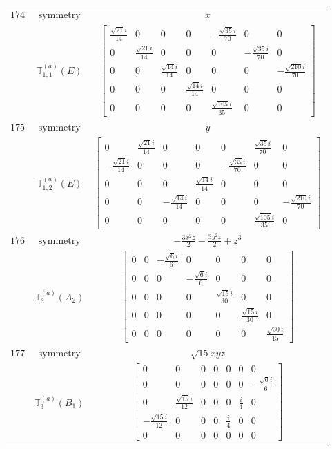 \documentclass[fleqn,8pt,landscape]{jsarticle}
\begin{document}
\begin{longtable}{ccc}
$ 174 $ & $ \text{symmetry} $ & $ x $ \\
$  $ & $ \mathbb{T}_{1,1}^{(a)}(E) $ & $ \begin{bmatrix} \frac{\sqrt{21} i}{14} & 0 & 0 & 0 & - \frac{\sqrt{35} i}{70} & 0 & 0 \\ 0 & \frac{\sqrt{21} i}{14} & 0 & 0 & 0 & - \frac{\sqrt{35} i}{70} & 0 \\ 0 & 0 & \frac{\sqrt{14} i}{14} & 0 & 0 & 0 & - \frac{\sqrt{210} i}{70} \\ 0 & 0 & 0 & \frac{\sqrt{14} i}{14} & 0 & 0 & 0 \\ 0 & 0 & 0 & 0 & \frac{\sqrt{105} i}{35} & 0 & 0 \end{bmatrix} $ \\ \hline
$ 175 $ & $ \text{symmetry} $ & $ y $ \\
$  $ & $ \mathbb{T}_{1,2}^{(a)}(E) $ & $ \begin{bmatrix} 0 & \frac{\sqrt{21} i}{14} & 0 & 0 & 0 & \frac{\sqrt{35} i}{70} & 0 \\ - \frac{\sqrt{21} i}{14} & 0 & 0 & 0 & - \frac{\sqrt{35} i}{70} & 0 & 0 \\ 0 & 0 & 0 & \frac{\sqrt{14} i}{14} & 0 & 0 & 0 \\ 0 & 0 & - \frac{\sqrt{14} i}{14} & 0 & 0 & 0 & - \frac{\sqrt{210} i}{70} \\ 0 & 0 & 0 & 0 & 0 & \frac{\sqrt{105} i}{35} & 0 \end{bmatrix} $ \\ \hline
$ 176 $ & $ \text{symmetry} $ & $ - \frac{3 x^{2} z}{2} - \frac{3 y^{2} z}{2} + z^{3} $ \\
$  $ & $ \mathbb{T}_{3}^{(a)}(A_{2}) $ & $ \begin{bmatrix} 0 & 0 & - \frac{\sqrt{6} i}{6} & 0 & 0 & 0 & 0 \\ 0 & 0 & 0 & - \frac{\sqrt{6} i}{6} & 0 & 0 & 0 \\ 0 & 0 & 0 & 0 & \frac{\sqrt{15} i}{30} & 0 & 0 \\ 0 & 0 & 0 & 0 & 0 & \frac{\sqrt{15} i}{30} & 0 \\ 0 & 0 & 0 & 0 & 0 & 0 & \frac{\sqrt{30} i}{15} \end{bmatrix} $ \\ \hline
$ 177 $ & $ \text{symmetry} $ & $ \sqrt{15} x y z $ \\
$  $ & $ \mathbb{T}_{3}^{(a)}(B_{1}) $ & $ \begin{bmatrix} 0 & 0 & 0 & 0 & 0 & 0 & 0 \\ 0 & 0 & 0 & 0 & 0 & 0 & - \frac{\sqrt{6} i}{6} \\ 0 & \frac{\sqrt{15} i}{12} & 0 & 0 & 0 & \frac{i}{4} & 0 \\ - \frac{\sqrt{15} i}{12} & 0 & 0 & 0 & \frac{i}{4} & 0 & 0 \\ 0 & 0 & 0 & 0 & 0 & 0 & 0 \end{bmatrix} $ \\ \hline

\end{longtable}
\end{document}
